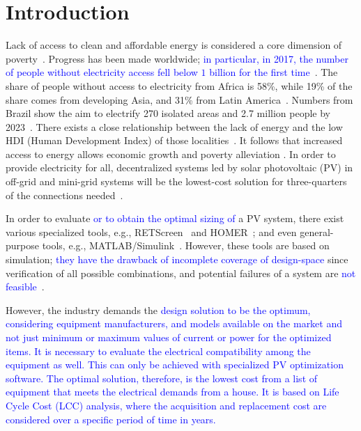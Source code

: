 \documentclass[runningheads]{llncs}
\begin{document}
\section{Introduction}
Lack of access to clean and affordable energy is considered a core dimension of poverty~\cite{Hussein2012}. Progress has been made worldwide; \textcolor{blue}{in particular, in 2017, the number of people without electricity access fell below $1$ billion for the first time}~\cite{IEAweo2018}. The share of people without access to electricity from Africa is 58\%, while 19\% of the share comes from developing Asia, and 31\% from Latin America~\cite{IEAweo2018}. Numbers from Brazil show the aim to electrify 270 isolated areas and 2.7 million people by 2023~\cite{EPE2018}. 
There exists a close relationship between the lack of energy and the low HDI (Human Development Index) of those localities~\cite{Coelho}. It follows that increased access to energy allows economic growth and poverty alleviation \cite{Karekesi}. In order to provide electricity for all, decentralized systems led by solar photovoltaic (PV) in off-grid and mini-grid systems will be the lowest-cost solution for three-quarters of the connections needed~\cite{Hussein2012}. 

In order to evaluate \textcolor{blue}{or to obtain the optimal sizing of} a PV system, there exist various specialized tools, e.g., RETScreen~\cite{Pradhan} and HOMER~\cite{Swarnkar}; and even general-purpose tools, e.g., MATLAB/Simulink~\cite{Gow1999}. However, these tools are based on simulation; \textcolor{blue}{they have the drawback of incomplete coverage of design-space} since verification of all possible combinations, and potential failures of a system are \textcolor{blue}{not feasible}~\cite{ClarkeHV18}. 


However, the industry demands the \textcolor{blue}{design solution to be the optimum, considering equipment manufacturers, and models available on the market and not just minimum or maximum values of current or power for the optimized items. It is necessary to evaluate the electrical compatibility among the equipment as well. This can only be achieved with specialized PV optimization software. The optimal solution, therefore, is the lowest cost from a list of equipment that meets the electrical demands from a house. It is based on Life Cycle Cost (LCC) analysis, where the acquisition and replacement cost are considered over a specific period of time in years.}
\end{document}
